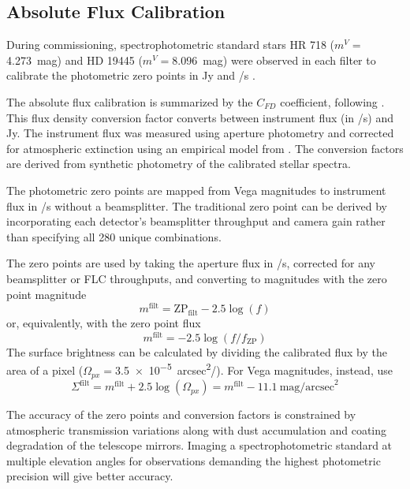 \subsection{Absolute Flux Calibration}

During commissioning, spectrophotometric standard stars HR 718 ($m^V=$\SI{4.273}{mag}) and HD 19445 ($m^V=$\SI{8.096}{mag}) were observed in each filter to calibrate the photometric zero points in \si{Jy} and \si{\electron/\second} \citep{hamuy_southern_1992,hamuy_southern_1994,stone_spectrophotometry_1996,zacharias_fourth_2013}.

The absolute flux calibration is summarized by the $C_{FD}$ coefficient, following \citet{gordon_james_2022}. This flux density conversion factor converts between instrument flux (in \si{\electron/\second}) and \si{Jy}. The instrument flux was measured using aperture photometry and corrected for atmospheric extinction using an empirical model from  \citet{buton_atmospheric_2013}. The conversion factors are derived from synthetic photometry of the calibrated stellar spectra.

The photometric zero points are mapped from Vega magnitudes to instrument flux in \si{\electron/\second} without a beamsplitter. The traditional zero point can be derived by incorporating each detector's beamsplitter throughput and camera gain rather than specifying all \num{280} unique combinations.

The zero points are used by taking the aperture flux in \si{\electron/\second}, corrected for any beamsplitter or FLC throughputs, and converting to magnitudes with the zero point magnitude
\begin{equation}
    m^\mathrm{filt}=\mathrm{ZP}_\mathrm{filt} - 2.5\log{\left(f\right)}
\end{equation}
or, equivalently, with the zero point flux
\begin{equation}
    m^\mathrm{filt}=-2.5\log{\left(f/f_\mathrm{ZP}\right)}
\end{equation}
The surface brightness can be calculated by dividing the calibrated flux by the area of a pixel ($\Omega_{px}=$\SI{3.5e-5}{arcsec^2/\pixel}). For Vega magnitudes, instead, use
\begin{equation}
    \label{eqn:surf_bright}
    \Sigma^\mathrm{filt} = m^\mathrm{filt} + 2.5\log{\left(\Omega_{px}\right)} = m^\mathrm{filt} - 11.1~\mathrm{mag/arcsec}^2
\end{equation}

The accuracy of the zero points and conversion factors is constrained by atmospheric transmission variations along with dust accumulation and coating degradation of the telescope mirrors. Imaging a spectrophotometric standard at multiple elevation angles for observations demanding the highest photometric precision will give better accuracy.

